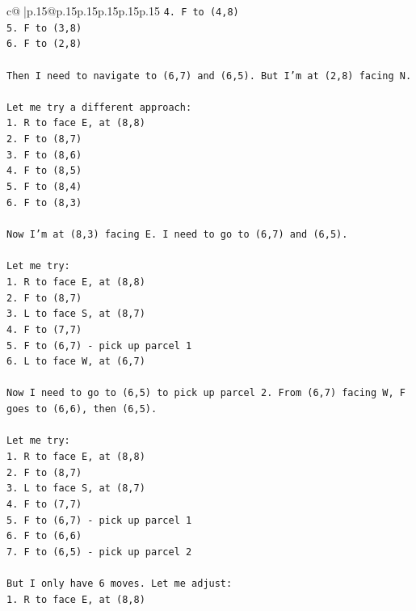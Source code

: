 \documentclass{article}
\begin{document}
{\begin{supertabular}{c@{$\;$}|p{.15\linewidth}@{}p{.15\linewidth}p{.15\linewidth}p{.15\linewidth}p{.15\linewidth}p{.15\linewidth}}
{{{\texttt{4. F to (4,8)} \\
\texttt{5. F to (3,8)} \\
\texttt{6. F to (2,8)} \\
\\ 
\texttt{Then I need to navigate to (6,7) and (6,5). But I'm at (2,8) facing N.} \\
\\ 
\texttt{Let me try a different approach:} \\
\texttt{1. R to face E, at (8,8)} \\
\texttt{2. F to (8,7)} \\
\texttt{3. F to (8,6)} \\
\texttt{4. F to (8,5)} \\
\texttt{5. F to (8,4)} \\
\texttt{6. F to (8,3)} \\
\\ 
\texttt{Now I'm at (8,3) facing E. I need to go to (6,7) and (6,5).} \\
\\ 
\texttt{Let me try:} \\
\texttt{1. R to face E, at (8,8)} \\
\texttt{2. F to (8,7)} \\
\texttt{3. L to face S, at (8,7)} \\
\texttt{4. F to (7,7)} \\
\texttt{5. F to (6,7) {-} pick up parcel 1} \\
\texttt{6. L to face W, at (6,7)} \\
\\ 
\texttt{Now I need to go to (6,5) to pick up parcel 2. From (6,7) facing W, F goes to (6,6), then (6,5).} \\
\\ 
\texttt{Let me try:} \\
\texttt{1. R to face E, at (8,8)} \\
\texttt{2. F to (8,7)} \\
\texttt{3. L to face S, at (8,7)} \\
\texttt{4. F to (7,7)} \\
\texttt{5. F to (6,7) {-} pick up parcel 1} \\
\texttt{6. F to (6,6)} \\
\texttt{7. F to (6,5) {-} pick up parcel 2} \\
\\ 
\texttt{But I only have 6 moves. Let me adjust:} \\
\texttt{1. R to face E, at (8,8)} \\
}}}
\end{supertabular}}
\end{document}
